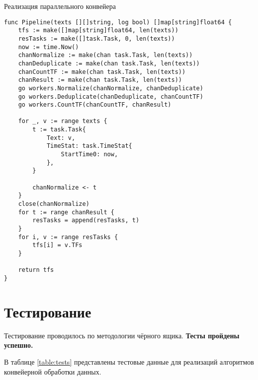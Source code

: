 \newpage

\begin{code}
\caption{Реализация параллельного конвейера}
\label{code:8}
\begin{verbatim}
func Pipeline(texts [][]string, log bool) []map[string]float64 {
	tfs := make([]map[string]float64, len(texts))
	resTasks := make([]task.Task, 0, len(texts))
	now := time.Now()
	chanNormalize := make(chan task.Task, len(texts))
	chanDeduplicate := make(chan task.Task, len(texts))
	chanCountTF := make(chan task.Task, len(texts))
	chanResult := make(chan task.Task, len(texts))
	go workers.Normalize(chanNormalize, chanDeduplicate)
	go workers.Deduplicate(chanDeduplicate, chanCountTF)
	go workers.CountTF(chanCountTF, chanResult)

	for _, v := range texts {
		t := task.Task{
			Text: v,
			TimeStat: task.TimeStat{
				StartTime0: now,
			},
		}

		chanNormalize <- t
	}
	close(chanNormalize)
	for t := range chanResult {
		resTasks = append(resTasks, t)
	}
	for i, v := range resTasks {
		tfs[i] = v.TFs
	}

	return tfs
}
\end{verbatim}
\end{code}

\newpage

\section{Тестирование}
Тестирование проводилось по методологии чёрного ящика. \textbf{Тесты пройдены успешно.}

В таблице \ref{table:tests} представлены тестовые данные для реализаций алгоритмов конвейерной обработки данных. 

